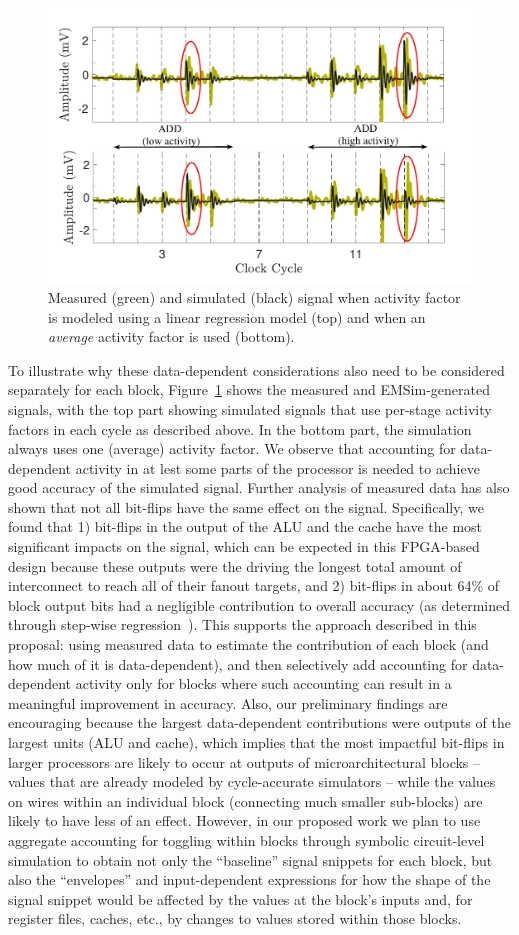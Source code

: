 \begin{figure}
	\centering
\vspace{-0.2in}
	\includegraphics[width=0.45\columnwidth]{figure/alpha2.pdf}
\vspace{-0.3in}
	\caption{Measured (green) and simulated (black) signal when activity factor is modeled using a linear regression model (top) and when an \textit{average} activity factor is used (bottom).}
	\label{fig:alpha}
\end{figure}
To illustrate why these data-dependent considerations also need to be considered separately for each block, Figure~\ref{fig:alpha} shows the measured and EMSim-generated signals, with the top part showing simulated signals that use per-stage activity factors in each cycle as described above. In the bottom part, the simulation always uses one (average) activity factor. We observe that accounting for data-dependent activity in at lest some parts of the processor is needed to achieve good accuracy of the simulated signal. Further analysis of measured data has also shown that not all bit-flips have the same effect on the signal. Specifically, we found that 1) bit-flips in the output of the ALU and the cache have the most significant impacts on the signal, which can be expected in this FPGA-based design because these outputs were the driving the longest total amount of interconnect to reach all of their fanout targets, and 2) bit-flips in about 64\% of block output bits had a negligible contribution to overall accuracy (as determined through step-wise regression~\cite{f-test}). This supports the approach described in this proposal: using measured data to estimate the contribution of each block (and how much of it is data-dependent), and then selectively add accounting for data-dependent activity only for blocks where such accounting can result in a meaningful improvement in accuracy. Also, our preliminary findings are encouraging because the largest data-dependent contributions were outputs of the largest units (ALU and cache), which implies that the most impactful bit-flips in larger processors are likely to occur at outputs of microarchitectural blocks -- values that are already modeled by cycle-accurate simulators -- while the values on wires within an individual block (connecting much smaller sub-blocks) are likely to have less of an effect. However, in our proposed work we plan to use aggregate accounting for toggling within blocks through symbolic circuit-level simulation to obtain not only the ``baseline'' signal snippets for each block, but also the ``envelopes'' and input-dependent expressions for how the shape of the signal snippet would be affected by the values at the block's inputs and, for register files, caches, etc., by changes to values stored within those blocks.

